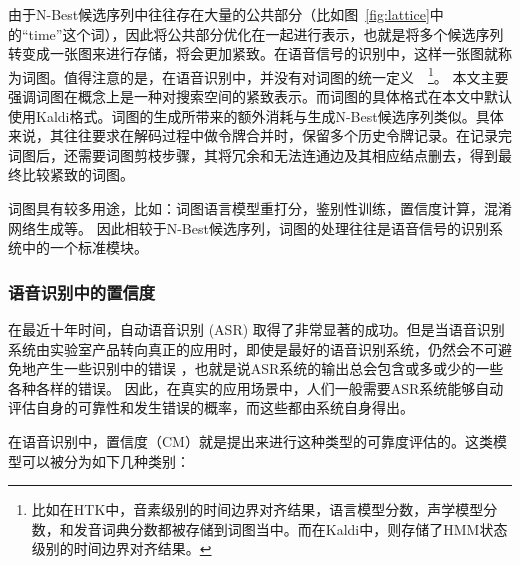 由于N-Best候选序列中往往存在大量的公共部分（比如图~\ref{fig:lattice}中的“time”这个词），因此将公共部分优化在一起进行表示，也就是将多个候选序列转变成一张图来进行存储，将会更加紧致。在语音信号的识别中，这样一张图就称为词图。值得注意的是，在语音识别中，并没有对词图的统一定义~\cite{povey2012generating}~\footnote{比如在HTK中，音素级别的时间边界对齐结果，语言模型分数，声学模型分数，和发音词典分数都被存储到词图当中。而在Kaldi中，则存储了HMM状态级别的时间边界对齐结果。}。
本文主要强调词图在概念上是一种对搜索空间的紧致表示。而词图的具体格式在本文中默认使用Kaldi格式。词图的生成所带来的额外消耗与生成N-Best候选序列类似。具体来说，其往往要求在解码过程中做令牌合并时，保留多个历史令牌记录。在记录完词图后，还需要词图剪枝步骤，其将冗余和无法连通边及其相应结点删去，得到最终比较紧致的词图。

词图具有较多用途，比如：词图语言模型重打分，鉴别性训练，置信度计算，混淆网络生成等。
因此相较于N-Best候选序列，词图的处理往往是语音信号的识别系统中的一个标准模块。


\subsubsection{语音识别中的置信度}
\label{sec:intro-cm}

在最近十年时间，自动语音识别 (ASR) 取得了非常显著的成功。但是当语音识别系统由实验室产品转向真正的应用时，即使是最好的语音识别系统，仍然会不可避免地产生一些识别中的错误 \cite{ruan2016speech}，也就是说ASR系统的输出总会包含或多或少的一些各种各样的错误。
因此，在真实的应用场景中，人们一般需要ASR系统能够自动评估自身的可靠性和发生错误的概率，而这些都由系统自身得出。

在语音识别中，置信度（CM）就是提出来进行这种类型的可靠度评估的\cite{jiang2005confidence}。这类模型可以被分为如下几种类别：

